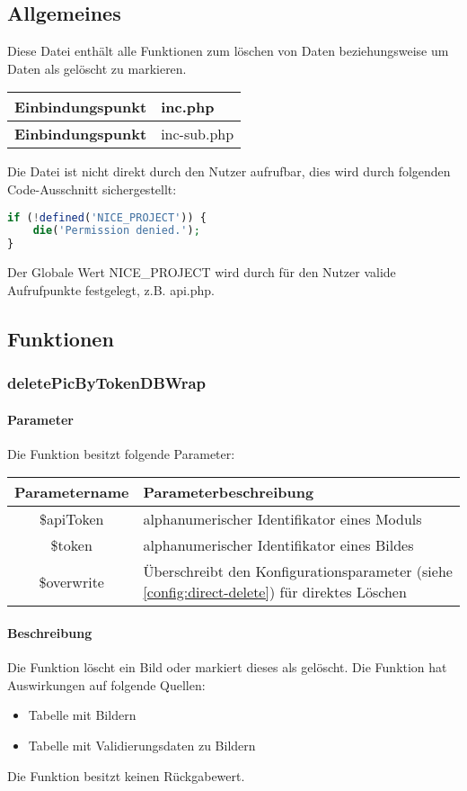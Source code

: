 \subsection{Allgemeines} Diese Datei enthält alle Funktionen zum löschen von Daten beziehungsweise um Daten als gelöscht zu markieren.
\begin{table}[H]
	\begin{tabular}{|c|p{11cm}|}
		\hline
		\textbf{Einbindungspunkt} & inc.php \\ \hline
		\textbf{Einbindungspunkt} & inc-sub.php \\ \hline
	\end{tabular}
\end{table}
Die Datei ist nicht direkt durch den Nutzer aufrufbar, dies wird durch folgenden Code-Ausschnitt sichergestellt:
\begin{lstlisting}[language=php]
if (!defined('NICE_PROJECT')) {
	die('Permission denied.');
}
\end{lstlisting}
Der Globale Wert {\glqq NICE\_PROJECT\grqq} wird durch für den Nutzer valide Aufrufpunkte festgelegt, z.B. {\glqq api.php\grqq}.
\newpage
\subsection{Funktionen}
\subsubsection{deletePicByTokenDBWrap}
\paragraph{Parameter} Die Funktion besitzt folgende Parameter:
\begin{table}[H]
	\begin{tabular}{|c|p{11cm}|}
		\hline
		\textbf{Parametername} & \textbf{Parameterbeschreibung} \\ \hline
		\$apiToken  & alphanumerischer Identifikator eines Moduls \\ \hline
		\$token     & alphanumerischer Identifikator eines Bildes \\ \hline
		\$overwrite & Überschreibt den Konfigurationsparameter (siehe \autoref{config:direct-delete}) für direktes Löschen  \\ \hline
	\end{tabular}
\end{table}
\paragraph{Beschreibung} Die Funktion löscht ein Bild oder markiert dieses als gelöscht. Die Funktion hat Auswirkungen auf folgende Quellen:
\begin{itemize}
	\item Tabelle mit Bildern
	\item Tabelle mit Validierungsdaten zu Bildern
\end{itemize}
Die Funktion besitzt keinen Rückgabewert.
